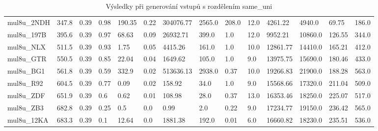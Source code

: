 \begin{landscape}
\begin{table}[!ht]
{\begin{tabular}{|l|l|l|l|l|l|l|l|l|l|l|l|l|l|}
        mul8u\_2NDH & 347.8 & 0.39 & 0.98 & 190.35 & 0.22 & 304076.77 & 2565.0 & 208.0 & 12.0 & 4261.22 & 4940.0 & 69.75 & 186.0 \\ 
        mul8u\_197B & 395.6 & 0.39 & 0.97 & 68.63 & 0.09 & 26932.71 & 399.0 & 1.0 & 12.0 & 9952.21 & 10860.0 & 126.55 & 344.0 \\ 
        mul8u\_NLX & 511.5 & 0.39 & 0.93 & 1.75 & 0.05 & 4415.26 & 161.0 & 1.0 & 10.0 & 12861.77 & 14410.0 & 165.21 & 412.0 \\ 
        mul8u\_GTR & 550.5 & 0.39 & 0.85 & 22.04 & 0.04 & 1649.62 & 105.0 & 1.0 & 9.0 & 13975.75 & 15690.0 & 180.46 & 433.0 \\ 
        mul8u\_BG1 & 561.8 & 0.39 & 0.59 & 332.9 & 0.02 & 513636.13 & 2938.0 & 0.37 & 10.0 & 19266.83 & 21900.0 & 188.28 & 563.0 \\ 
        mul8u\_R92 & 604.5 & 0.39 & 0.77 & 0.09 & 0.02 & 158.92 & 34.0 & 1.0 & 9.0 & 15568.66 & 17320.0 & 211.04 & 509.0 \\ 
        mul8u\_ZDF & 651.9 & 0.39 & 0.6 & 0.62 & 0.01 & 108.98 & 28.0 & 0.37 & 13.0 & 16353.46 & 18250.0 & 225.07 & 517.0 \\ 
        mul8u\_ZB3 & 682.8 & 0.39 & 0.25 & 0.5 & 0.0 & 0.99 & 2.0 & 0.22 & 9.0 & 17234.77 & 19150.0 & 236.42 & 565.0 \\ 
        mul8u\_12KA & 683.3 & 0.39 & 0.1 & 12.64 & 0.0 & 1881.38 & 192.0 & 0.01 & 6.0 & 16660.82 & 18230.0 & 235.51 & 536.0 \\ 
    \end{tabular}}
    \caption{Výsledky při generování vstupů s rozdělením same\_uni}
    \label{same_uni}
\end{table}


\end{landscape}
